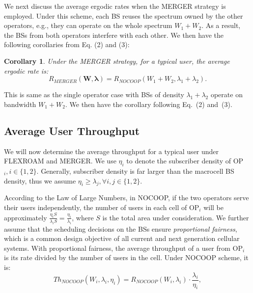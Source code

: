\documentclass[conference]{IEEEtran}
\newtheorem{corollary}{\textbf{Corollary}}
\begin{document}
We next discuss the average ergodic rates when the MERGER strategy is employed. Under this scheme, each BS reuses the spectrum owned by the other operators, e.g., they can operate on the whole spectrum $W_1 + W_2$. As a result, the BSs from both operators interfere with each other. We then have the following corollaries from Eq. (2) and (3):
\begin{corollary}
Under the MERGER strategy, for a typical user, the average ergodic rate is:
\begin{equation}
R_{MERGER}(\mathbf{W}, \boldsymbol \lambda) = R_{NOCOOP}(W_1 + W_2, \lambda_1 + \lambda_2).
\end{equation}
\end{corollary}
\begin{IEEEproof}
This is same as the single operator case with BSs of density $\lambda_1 + \lambda_2$ operate on bandwidth $W_1 + W_2$. We then have the corollary following Eq.~(2) and~(3).
\end{IEEEproof}

\subsection{Average User Throughput}

We will now determine the average throughput for a typical user under FLEXROAM and MERGER. We use $\eta_i$ to denote the subscriber density of OP$_i, i \in \{1,2\}$. Generally, subscriber density is far larger than the macrocell BS density, thus we assume $\eta_i \geq \lambda_j, \forall i, j  \in \{1,2\}$.

According to the Law of Large Numbers, in NOCOOP, if the two operators serve their users independently, the number of users in each cell of OP$_i$ will be approximately $\frac{\eta_i S}{\lambda_i S} = \frac{\eta_i}{\lambda_i}$, where $S$ is the total area under consideration. We further assume that the scheduling decisions on the BSs ensure \textit{proportional fairness}, which is a common design objective of all current and next generation cellular systems. With proportional fairness, the average throughput of a user from OP$_i$ is its rate divided by the number of users in the cell. Under NOCOOP scheme, it is:
\begin{equation}
Th_{NOCOOP}(W_i, \lambda_i, \eta_i) = R_{NOCOOP}(W_i, \lambda_i) \cdot \frac{ \lambda_i}{\eta_i},
\end{equation}
\end{document}
